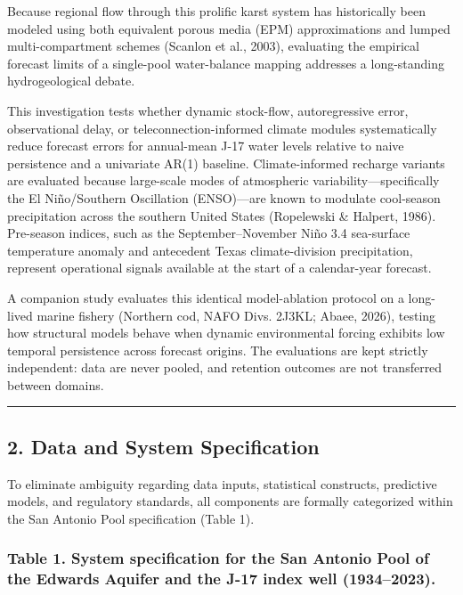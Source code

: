 \documentclass[11pt]{article}
\begin{document}
Because regional flow through this prolific karst system has
historically been modeled using both equivalent porous media (EPM)
approximations and lumped multi-compartment schemes (Scanlon et al.,
2003), evaluating the empirical forecast limits of a single-pool
water-balance mapping addresses a long-standing hydrogeological debate.

This investigation tests whether dynamic stock-flow, autoregressive
error, observational delay, or teleconnection-informed climate modules
systematically reduce forecast errors for annual-mean J-17 water levels
relative to naive persistence and a univariate AR(1) baseline.
Climate-informed recharge variants are evaluated because large-scale
modes of atmospheric variability---specifically the El Niño/Southern
Oscillation (ENSO)---are known to modulate cool-season precipitation
across the southern United States (Ropelewski \& Halpert, 1986).
Pre-season indices, such as the September--November Niño 3.4 sea-surface
temperature anomaly and antecedent Texas climate-division precipitation,
represent operational signals available at the start of a calendar-year
forecast.

A companion study evaluates this identical model-ablation protocol on a
long-lived marine fishery (Northern cod, NAFO Divs. 2J3KL; Abaee, 2026),
testing how structural models behave when dynamic environmental forcing
exhibits low temporal persistence across forecast origins. The
evaluations are kept strictly independent: data are never pooled, and
retention outcomes are not transferred between domains.

\begin{center}\rule{0.5\linewidth}{0.5pt}\end{center}

\subsection{2. Data and System
Specification}\label{data-and-system-specification}

To eliminate ambiguity regarding data inputs, statistical constructs,
predictive models, and regulatory standards, all components are formally
categorized within the San Antonio Pool specification (Table 1).

\subsubsection{Table 1. System specification for the San Antonio Pool of
the Edwards Aquifer and the J-17 index well
(1934--2023).}\label{table-1.-system-specification-for-the-san-antonio-pool-of-the-edwards-aquifer-and-the-j-17-index-well-19342023.}
\end{document}
